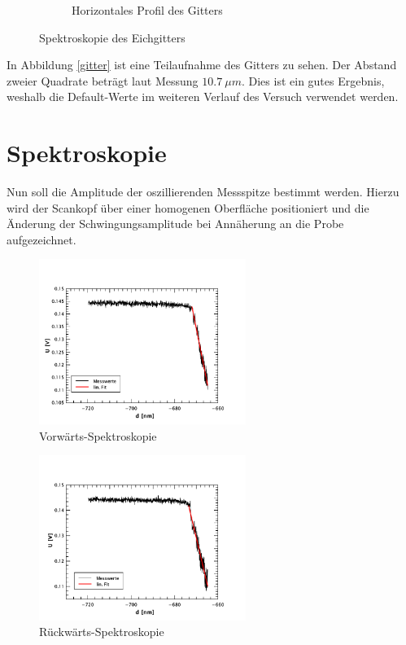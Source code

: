 \begin{figure}
\begin{subfigure}[hb]{0.4\textwidth}
        \caption{Horizontales Profil des Gitters}
    \end{subfigure}
    \caption{Spektroskopie des Eichgitters}
\end{figure}
In Abbildung \ref{gitter} ist eine Teilaufnahme des Gitters zu sehen. Der Abstand 
zweier Quadrate beträgt laut Messung $\SI{10,7}{\mu m}$. Dies ist ein gutes 
Ergebnis, weshalb die Default-Werte im weiteren Verlauf des Versuch verwendet 
werden.

    \section{Spektroskopie}

Nun soll die Amplitude der oszillierenden Messspitze bestimmt werden. Hierzu wird
der Scankopf über einer homogenen Oberfläche positioniert und die Änderung der 
Schwingungsamplitude bei Annäherung an die Probe aufgezeichnet.
\begin{figure}[hp]
    \centering
    \includegraphics[width=0.6\textwidth]{Mess/spek_forw.pdf}
    \caption{Vorwärts-Spektroskopie}
    \label{spek_forw}
\end{figure}
\begin{figure}[hp]
    \centering
    \includegraphics[width=0.6\textwidth]{Mess/spek_backw.pdf}
    \caption{Rückwärts-Spektroskopie}
    \label{spek_backw}
\end{figure}

